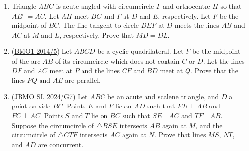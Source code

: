 \documentclass[11pt,paper=letter]{scrartcl}
\begin{document}
\begin{enumerate}[resume]

\item Triangle $ABC$ is acute-angled with circumcircle $\Gamma$ and orthocentre $H$ so that $AB ̸= AC$. Let $AH$ meet $BC$ and $\Gamma$ at $D$ and $E$, respectively. Let $F$ be the midpoint of $BC$. The line tangent to circle $DEF$ at $D$ meets the lines $AB$ and $AC$ at $M$ and $L$, respectively. Prove that $MD = DL$.

\item (\href{https://artofproblemsolving.com/community/c6h3135896p28425667}{BMO1 2014/5}) Let $ABCD$ be a cyclic quadrilateral. Let $F$ be the midpoint of the arc $AB$ of its circumcircle which does not contain $C$ or $D$. Let the lines $DF$ and $AC$ meet at $P$ and the lines $CF$ and $BD$ meet at $Q$. Prove that the lines $PQ$ and $AB$ are parallel. %


\item (\href{https://artofproblemsolving.com/community/c6h3598814p35195606}{JBMO SL 2024/G7}) Let $ABC$ be an acute and scalene triangle, and $D$ a point on side $BC$. Points $E$ and $F$ lie on $AD$ such that $EB \perp AB$ and $FC \perp AC$. Points $S$ and $T$ lie on $BC$ such that $SE \parallel AC$ and $TF \parallel AB$. Suppose the circumcircle of $\triangle BSE$ intersects $AB$ again at $M$, and the circumcircle of $\triangle CTF$ intersects $AC$ again at $N$. Prove that lines $MS$, $NT$, and $AD$ are concurrent. %


\end{enumerate}
\end{document}
